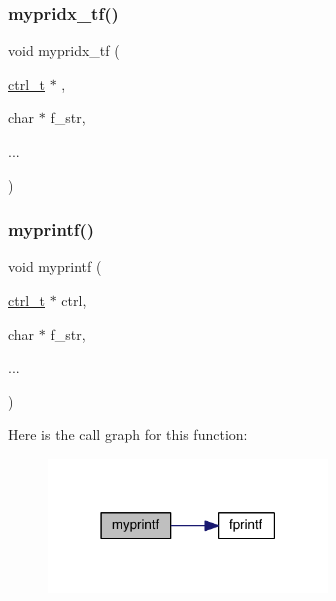\subsubsection{\texorpdfstring{mypridx\+\_\+tf()}{mypridx\_tf()}}
{\footnotesize\ttfamily void mypridx\+\_\+tf (\begin{DoxyParamCaption}\item[{\hyperlink{a00742}{ctrl\+\_\+t} $\ast$}]{,  }\item[{char $\ast$}]{f\+\_\+str,  }\item[{}]{... }\end{DoxyParamCaption})}

\mbox{\label{a00951_a22d1af3ffc94aed89b6809987bd6146a}} 
\subsubsection{\texorpdfstring{myprintf()}{myprintf()}}
{\footnotesize\ttfamily void myprintf (\begin{DoxyParamCaption}\item[{\hyperlink{a00742}{ctrl\+\_\+t} $\ast$}]{ctrl,  }\item[{char $\ast$}]{f\+\_\+str,  }\item[{}]{... }\end{DoxyParamCaption})}

Here is the call graph for this function\+:\nopagebreak
\begin{figure}[H]
\begin{center}
\leavevmode
\includegraphics[width=210pt]{a00951_a22d1af3ffc94aed89b6809987bd6146a_cgraph}
\end{center}
\end{figure}
\mbox{\label{a00951_a44d0f929b68d2c17a519a3f4b726787a}} 
